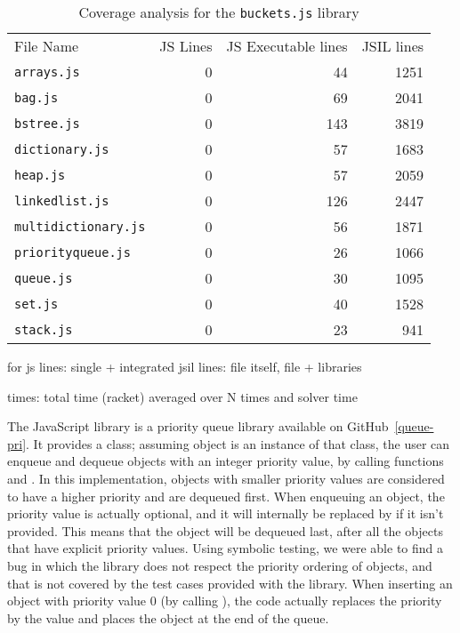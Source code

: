 \begin{table*}[h]
{
\small
\begin{tabular}{lrrr}
\toprule
File Name & JS Lines & JS Executable lines & JSIL lines \\
\cmidrule{1-1} \cmidrule{3-3}
\texttt{arrays.js} & 0 & 44 & 1251 \\
\texttt{bag.js} & 0 & 69 & 2041 \\
\texttt{bstree.js} & 0 & 143 & 3819 \\
\texttt{dictionary.js} & 0 & 57 & 1683 \\
\texttt{heap.js} & 0 & 57 & 2059 \\
\texttt{linkedlist.js} & 0 & 126 & 2447 \\
\texttt{multidictionary.js} & 0 & 56 & 1871 \\
\texttt{priorityqueue.js} & 0 & 26 & 1066 \\
\texttt{queue.js} & 0 & 30 & 1095 \\
\texttt{set.js} & 0 & 40 & 1528 \\
\texttt{stack.js} & 0 & 23 & 941 \\
\bottomrule
\end{tabular}
}
\caption{Coverage analysis for the \texttt{buckets.js} library}
\end{table*}
\FloatBarrier

for js lines: single + integrated
jsil lines: file itself, file + libraries

times: total time (racket) averaged over N times and solver time


The JavaScript  library is a priority queue library available on GitHub~\ref{queue-pri}.
It provides a  class; assuming object  is an instance of that class, the user can enqueue and dequeue objects with an integer priority value, by calling functions  and .
In this implementation, objects with smaller priority values are considered to have a higher priority and are dequeued first.
When enqueuing an object, the priority value is actually optional, and it will internally be replaced by  if it isn't provided.
This means that the object will be dequeued last, after all the objects that have explicit priority values.
Using \cosette symbolic testing, we were able to find a bug in which the library does not respect the priority ordering of objects, and that is not covered by the test cases provided with the library.
When inserting an object with priority value $0$ (by calling ), the code actually replaces the priority by the  value and places the object at the end of the queue.

